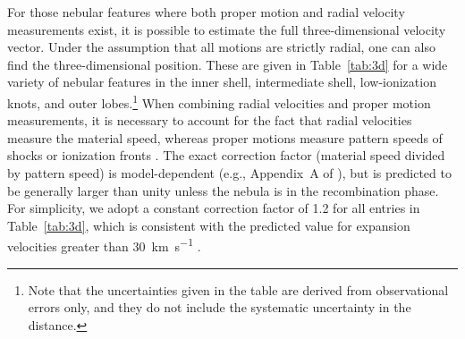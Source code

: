 \documentclass[useAMS, usenatbib]{mnras}
\begin{document}
For those nebular features where both proper motion and radial velocity measurements exist,
it is possible to estimate the full three-dimensional velocity vector.
Under the assumption that all motions are strictly radial,
one can also find the three-dimensional position.
These are given in Table~\ref{tab:3d} for a wide variety of nebular features
in the inner shell, intermediate shell, low-ionization knots, and outer lobes.\footnote{
  Note that the uncertainties given in the table are derived from observational errors only,
  and they do not include the systematic uncertainty in the distance.
}
When combining radial velocities and proper motion measurements,
it is necessary to account for the fact that radial velocities measure the material speed,
whereas proper motions measure pattern speeds of shocks or ionization fronts \citep{Mellema:2004a}. 
The exact correction factor (material speed divided by pattern speed)
is model-dependent (e.g., Appendix~A of \citealp{ODell:2009c}),
but is predicted to be generally larger than unity
\citetext{see Fig.~8 of \citealp{Jacob:2013a}}
unless the nebula is in the recombination phase.
For simplicity, we adopt a constant correction factor of 1.2 for all entries in Table~\ref{tab:3d},
which is consistent with the predicted value for expansion velocities greater than \SI{30}{km.s^{-1}}
\citetext{see Fig.~3 of \citealp{Schonberner:2019a}}.
\end{document}
